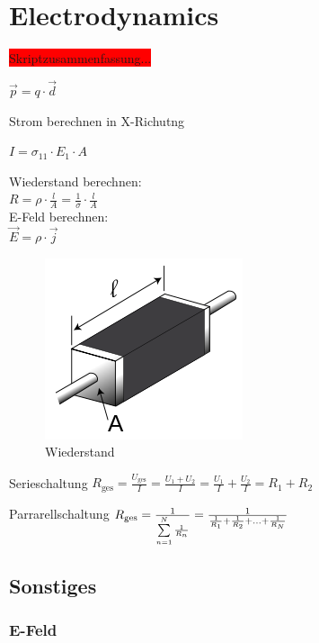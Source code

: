 \documentclass[a4paper]{scrartcl}
\begin{document}
\section{Electrodynamics}

\colorbox{red}{Skriptzusammenfassung...}

$ \vec{p}=q\cdot\vec{d} $


Strom berechnen in X-Richutng

$ I = \sigma_{11} \cdot E_1 \cdot A $


Wiederstand berechnen:\\
$ R=\rho\cdot\frac{l}{A}=\frac{1}{\sigma} \cdot\frac{l}{A}$\\

E-Feld berechnen:\\
$ \vec E = \rho \cdot \vec j $\\


\begin{figure}[h!]
\begin{center}
\includegraphics[scale=0.5]{images/Wiederstand.png}
\caption{Wiederstand}
\label{fig:Wiederstand}
\end{center}
\end{figure}

Serieschaltung
$R_\mathrm{ges} = \frac{U_\mathrm{ges}}{I} = \frac{U_1 + U_2}{I} = \frac{U_1}{I} + \frac{U_2}{I} = R_1 + R_2 $


Parrarellschaltung
$
R_\mathrm{ges} = {1 \over {\sum\limits_{n=1}^N {1 \over R_n}}} = {1 \over {{1 \over R_1} + {1 \over R_2} + \ldots + {1 \over R_N}}}$





\subsection{Sonstiges}



\subsubsection{E-Feld}
\end{document}
